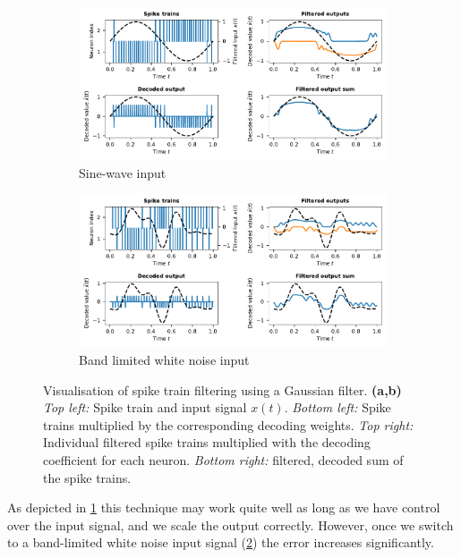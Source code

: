 \documentclass[10pt,letterpaper,oneside]{article}
\begin{document}
\begin{figure}
	\centering
	\begin{subfigure}{\textwidth}
		\includegraphics{media/two_neurons_filtered_small.pdf}
		\caption{Sine-wave input}
		\label{fig:two_neurons_filtered}
	\end{subfigure}
	\begin{subfigure}{\textwidth}
		\includegraphics{media/two_neurons_filtered_white_noise_small.pdf}
		\caption{Band limited white noise input}
		\label{fig:two_neurons_filtered_white_noise}
	\end{subfigure}
	\caption{Visualisation of spike train filtering using a Gaussian filter. \textbf{(a,b)} \emph{Top left:} Spike train and input signal $x(t)$. \emph{Bottom left:} Spike trains multiplied by the corresponding decoding weights. \emph{Top right:} Individual filtered spike trains multiplied with the decoding coefficient for each neuron. \emph{Bottom right:} filtered, decoded sum of the spike trains. }
	\label{fig:filtered}
\end{figure}

As depicted in \cref{fig:two_neurons_filtered} this technique may work quite well as long as we have control over the input signal, and we scale the output correctly. However, once we switch to a band-limited white noise input signal (\cref{fig:two_neurons_filtered_white_noise}) the error increases significantly.
\end{document}
